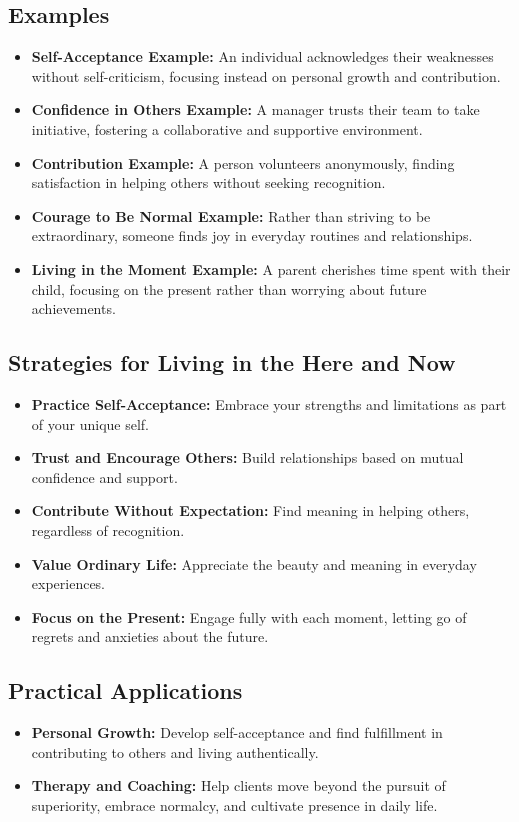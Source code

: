 \subsection*{Examples}
\begin{itemize}
    \item \textbf{Self-Acceptance Example:} An individual acknowledges their weaknesses without self-criticism, focusing instead on personal growth and contribution.
    \item \textbf{Confidence in Others Example:} A manager trusts their team to take initiative, fostering a collaborative and supportive environment.
    \item \textbf{Contribution Example:} A person volunteers anonymously, finding satisfaction in helping others without seeking recognition.
    \item \textbf{Courage to Be Normal Example:} Rather than striving to be extraordinary, someone finds joy in everyday routines and relationships.
    \item \textbf{Living in the Moment Example:} A parent cherishes time spent with their child, focusing on the present rather than worrying about future achievements.
\end{itemize}

\subsection*{Strategies for Living in the Here and Now}
\begin{itemize}
    \item \textbf{Practice Self-Acceptance:} Embrace your strengths and limitations as part of your unique self.
    \item \textbf{Trust and Encourage Others:} Build relationships based on mutual confidence and support.
    \item \textbf{Contribute Without Expectation:} Find meaning in helping others, regardless of recognition.
    \item \textbf{Value Ordinary Life:} Appreciate the beauty and meaning in everyday experiences.
    \item \textbf{Focus on the Present:} Engage fully with each moment, letting go of regrets and anxieties about the future.
\end{itemize}

\subsection*{Practical Applications}
\begin{itemize}
    \item \textbf{Personal Growth:} Develop self-acceptance and find fulfillment in contributing to others and living authentically.
    \item \textbf{Therapy and Coaching:} Help clients move beyond the pursuit of superiority, embrace normalcy, and cultivate presence in daily life.
\end{itemize}